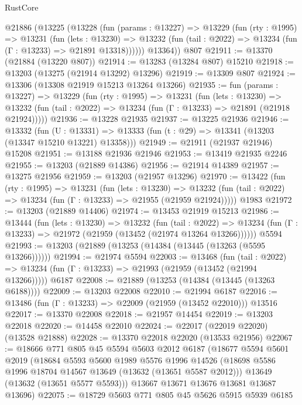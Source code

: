 \begin{lexlean}{RustCore}
\begin{coremodule}
    @21886
      (@13225
        (@13228
          (fun (params : @13227) =>
          @13229
            (fun (rty : @1995) =>
            @13231
              (fun (lets : @13230) =>
              @13232 (fun (tail : @2022) => @13234 (fun (Γ : @13233) => @21891 @13318))))))
        @13364))
    @807
@21911 := @13370 (@21884 (@13220 @807))
@21914 := @13283 (@13284 @807) @15210
@21918 := @13203 (@13275 (@21914 @13292) @13296)
@21919 := @13309 @807
@21924 := @13306 (@13308 @21919 @15213 @13264 @13266)
@21935 := fun (params : @13227) =>
  @13229
    (fun (rty : @1995) =>
    @13231
      (fun (lets : @13230) =>
      @13232 (fun (tail : @2022) => @13234 (fun (Γ : @13233) => @21891 (@21918 @21924)))))
@21936 := @13228 @21935
@21937 := @13225 @21936
@21946 := @13332
    (fun (U : @13331) => @13333 (fun (t : @29) => @13341 (@13203 (@13347 @15210 @13221) @13358)))
@21949 := @21911 (@21937 @21946) @15208
@21951 := @13188 @21936 @21946
@21953 := @13419 @21935 @2246
@21955 := @13203 (@21889 @14386)
@21956 := @21914 @14389
@21957 := @13275 @21956
@21959 := @13203 (@21957 @13296)
@21970 := @13422
    (fun (rty : @1995) =>
    @13231
      (fun (lets : @13230) =>
      @13232 (fun (tail : @2022) => @13234 (fun (Γ : @13233) => @21955 (@21959 @21924)))))
    @1983
@21972 := @13203 (@21889 @14406)
@21974 := @13453 @21919 @15213
@21986 := @13444
    (fun (lets : @13230) =>
    @13232
      (fun (tail : @2022) =>
      @13234 (fun (Γ : @13233) => @21972 (@21959 (@13452 (@21974 @13264 @13266))))))
    @5594
@21993 := @13203 (@21889 (@13253 (@14384 (@13445 (@13263 (@5595 @13266))))))
@21994 := @21974 @5594
@22003 := @13468
    (fun (tail : @2022) => @13234 (fun (Γ : @13233) => @21993 (@21959 (@13452 (@21994 @13266)))))
    @6187
@22008 := @21889 (@13253 (@14384 (@13445 (@13263 @6188))))
@22009 := @13203 @22008
@22010 := @21994 @6187
@22016 := @13486 (fun (Γ : @13233) => @22009 (@21959 (@13452 @22010))) @13516
@22017 := @13370 @22008
@22018 := @21957 @14454
@22019 := @13203 @22018
@22020 := @14458 @22010
@22024 := @22017 (@22019 @22020) (@13528 @21888)
@22028 := @13370 @22018 @22020 (@13533 @21956)
@22067 := @18666
    @771
    @805
    @45
    @5594
    @5603
    @2012
    @6187
    (@18677
      @5594
      @5601
      @2019
      (@18684
        @5593
        @5600
        @1989
        @5576
        @1996
        @14526
        (@18698 @5586 @1996 @18704 @14567 @13649 (@13632 (@13651 @5587 @2012)))
        @13649
        (@13632 (@13651 @5577 @5593)))
      @13667
      @13671
      @13676
      @13681
      @13687
      @13696)
@22075 := @18729 @5603 @771 @805 @45 @5626 @5915 @5939 @6185

\end{coremodule}
\end{lexlean}
